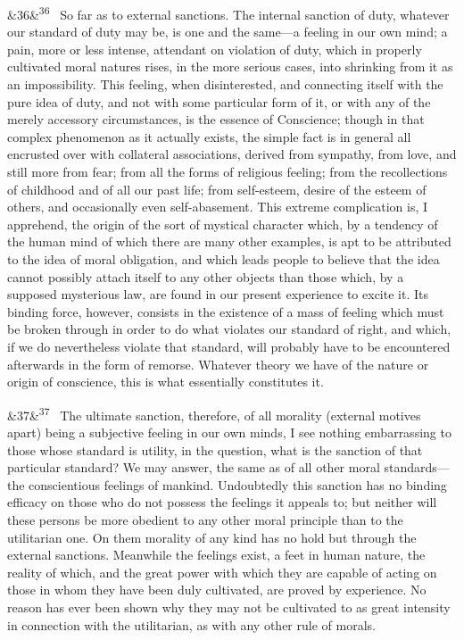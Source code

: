 \documentclass[12pt]{article}
\newcommand{\para}[1][]{\par\noindent\ifx&#1&\else\textsuperscript{\footnotesize #1}~\fi}
\begin{document}
\para[36] So far as to external sanctions. The internal sanction of duty, whatever our standard of duty may be, is one and the same---a feeling in our own mind; a pain, more or less intense, attendant on violation of duty, which in properly cultivated moral natures rises, in the more serious cases, into shrinking from it as an impossibility. This feeling, when disinterested, and connecting itself with the pure idea of duty, and not with some particular form of it, or with any of the merely accessory circumstances, is the essence of Conscience; though in that complex phenomenon as it actually exists, the simple fact is in general all encrusted over with collateral associations, derived from sympathy, from love, and still more from fear; from all the forms of religious feeling; from the recollections of childhood and of all our past life; from self-esteem, desire of the esteem of others, and occasionally even self-abasement. This extreme complication is, I apprehend, the origin of the sort of mystical character which, by a tendency of the human mind of which there are many other examples, is apt to be attributed to the idea of moral obligation, and which leads people to believe that the idea cannot possibly attach itself to any other objects than those which, by a supposed mysterious law, are found in our present experience to excite it. Its binding force, however, consists in the existence of a mass of feeling which must be broken through in order to do what violates our standard of right, and which, if we do nevertheless violate that standard, will probably have to be encountered afterwards in the form of remorse. Whatever theory we have of the nature or origin of conscience, this is what essentially constitutes it.

\para[37] The ultimate sanction, therefore, of all morality (external motives apart) being a subjective feeling in our own minds, I see nothing embarrassing to those whose standard is utility, in the question, what is the sanction of that particular standard? We may answer, the same as of all other moral standards---the conscientious feelings of mankind. Undoubtedly this sanction has no binding efficacy on those who do not possess the feelings it appeals to; but neither will these persons be more obedient to any other moral principle than to the utilitarian one. On them morality of any kind has no hold but through the external sanctions. Meanwhile the feelings exist, a feet in human nature, the reality of which, and the great power with which they are capable of acting on those in whom they have been duly cultivated, are proved by experience. No reason has ever been shown why they may not be cultivated to as great intensity in connection with the utilitarian, as with any other rule of morals.
\end{document}
